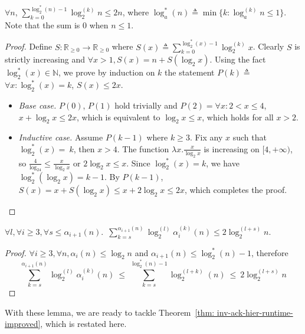 \begin{lem} \label{lem: sum-log-repeat}
	$\forall n$, $\displaystyle \sum_{k = 0}^{\log_2^*(n) - 1}\log_2^{(k)}n \le 2n$, where $\log_a^*(n) \triangleq \min\{k : \log_a^{(k)}n \le 1\}$. Note that the sum is $0$ when $n\le 1$.
\end{lem}

\begin{proof}
	Define $S: \mathbb{R}_{\ge 0}\to \mathbb{R}_{\ge 0}$ where $S(x) \triangleq \sum_{k = 0}^{\log_2^*(x) - 1}\log_2^{(k)}x$. Clearly $S$ is strictly increasing and $\forall x>1, S(x) = n + S(\log_2 x)$. Using the fact $\log_2^*(x)\in \mathbb{N}$, we prove by induction on $k$ the statement $P(k) \triangleq$ $\forall x: \log_2^*(x) = k$, $S(x)\le 2x$.
	\begin{itemize}[leftmargin=*]
		\item \emph{Base case.} $P(0)$, $P(1)$ hold trivially and $P(2) = \forall x: 2 < x \le 4$, $x + \log_2x \le 2x$, which is equivalent to $\log_2x \le x$, which holds for all $x > 2$.
		\item \emph{Inductive case.} Assume $P(k-1)$ where $k\ge 3$. Fix any $x$ such that $\log_2^*(x)=~k$, then $x > 4$. The function $\lambda x.\frac{x}{\log_2x}$ is increasing on $[4, +\infty)$, so $\frac{4}{\log_24} \le \frac{x}{\log_2x}$ or $2\log_2x \le x$. Since $\log_2^*(x) = k$, we have $\log_2^*(\log_2x) = k-1$. By $P(k-1)$, $S(x) = x + S(\log_2x) \le x + 2\log_2x \le 2x$, which completes the proof.
	\end{itemize}
\end{proof}

\begin{lem} \label{lem: sum-alpha-repeat}
	$\forall l, \forall i \ge 3, \forall s\le \alpha_{i+1}(n)$.~$\displaystyle \sum_{k=s}^{\alpha_{i+1}(n)} \log_2^{(l)}\alpha_i^{(k)}(n) \le 2\log_2^{(l+s)}n$.
\end{lem}

\begin{proof}
  $\forall i\ge 3, \forall n, \alpha_i(n)\le \log_2n$ and $\alpha_{i+1}(n)\le \log_2^*(n)-1$, therefore
	\begin{equation*}
	\sum_{k=s}^{\alpha_{i+1}(n)} \log_2^{(l)}\alpha_i^{(k)}(n) \ \le \
	\sum_{k=s}^{\log_2^*(n)-1} \log_2^{(l+k)}(n) \ \le \
	2\log_2^{(l+s)} n
	\end{equation*}
\end{proof}

With these lemma, we are ready to tackle Theorem~\ref{thm: inv-ack-hier-runtime-improved}, which is restated here.

